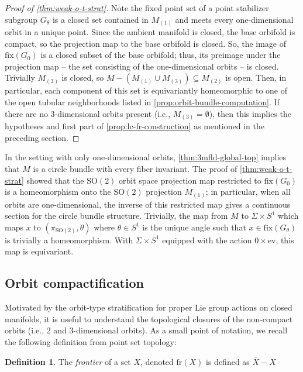 \documentclass[10pt, oneside]{article}
\newcommand{\SO}[1][2]{\text{SO}(#1)}
\newcommand{\cl}[1]{\overline{#1}}
\theoremstyle{definition}
\newtheorem{defn}{Definition}[section]
\theoremstyle{definition}
\begin{document}
\begin{proof}[Proof of \cref{thm:weak-o-t-strat}]
    Note the fixed point set of a point stabilizer subgroup $G_\theta$ is a closed set contained in $M_{(1)}$ and meets every one-dimensional orbit in a unique point. Since the ambient manifold is closed, the base orbifold is compact, so the projection map to the base orbifold is closed. So, the image of $\text{fix}(G_0)$ is a closed subset of the base orbifold; thus, its preimage under the projection map -- the set consisting of the one-dimensional orbits -- is closed. Trivially $M_{(3)}$ is closed, so $M - (M_{(1)}\cup \cl{M_{(3)}})\subseteq M_{(2)}$ is open. Then, in particular, each component of this set is equivariantly homeomorphic to one of the open tubular neighborhoods listed in \cref{prop:orbit-bundle-computation}. If there are no 3-dimensional orbits present (i.e., $M_{(3)}=\emptyset$), then this implies the hypotheses and first part of \cref{prop:lc-fr-construction} as mentioned in the preceding section.
\end{proof}

In the setting with only one-dimensional orbits, \cref{thm:3mfld-global-top} implies that $M$ is a circle bundle with every fiber invariant. The proof of \cref{thm:weak-o-t-strat} showed that the $\SO$ orbit space projection map restricted to $\text{fix}(G_0)$ is a homeomorphism onto the $\SO$ projection $M_{(1)}$; in particular, when all orbits are one-dimensional, the inverse of this restricted map gives a continuous section for the circle bundle structure. Trivially, the map from $M$ to $\Sigma \times S^1$  which maps $x$ to $(\pi_{\SO}, \theta)$ where $\theta\in S^1$ is the unique angle such that $x\in\text{fix}(G_\theta)$
is trivially a homeomorphism. With $\Sigma \times S^1$ equipped with the action $0\times \text{ev}$, this map is equivariant.

\subsection{Orbit compactification}
Motivated by the orbit-type stratification for proper Lie group actions on closed manifolds, it is useful to understand the topological closures of the non-compact orbits (i.e., 2 and 3-dimensional orbits). As a small point of notation, we recall the following definition from point set topology:
\begin{defn}
    The {\it frontier} of a set $X$, denoted $\text{fr}(X)$ is defined as $\cl{X}-X$
\end{defn}
\end{document}
